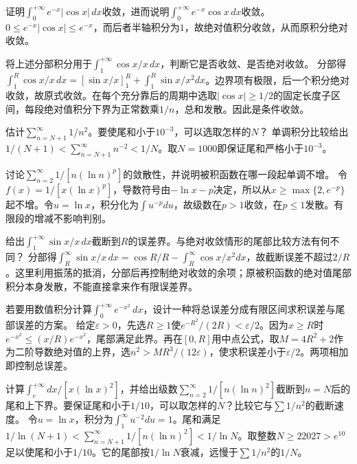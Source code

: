 证明\(\int_0^{+\infty}e^{-x}|\cos x|\,dx\)收敛，进而说明\(\int_0^{+\infty}e^{-x}\cos x\,dx\)收敛。
\solutionanswer
\(0\le e^{-x}|\cos x|\le e^{-x}\)，而后者半轴积分为\(1\)，故绝对值积分收敛，从而原积分绝对收敛。


将上述分部积分用于\(\int_1^{+\infty}\cos x/x\,dx\)，判断它是否收敛、是否绝对收敛。
\solutionanswer
分部得\(\int_1^R\cos x/x\,dx=[\sin x/x]_1^R+\int_1^R\sin x/x^2dx\)。边界项有极限，后一个积分绝对收敛，故原式收敛。在每个充分靠后的周期中选取\(|\cos x|\ge1/2\)的固定长度子区间，每段绝对值积分下界为正常数乘\(1/n\)，总和发散。因此是条件收敛。


估计\(\sum_{n=N+1}^{\infty}1/n^2\)。要使尾和小于\(10^{-3}\)，可以选取怎样的\(N\)？
\solutionanswer
单调积分比较给出\(1/(N+1)<\sum_{n=N+1}^\infty n^{-2}<1/N\)。取\(N=1000\)即保证尾和严格小于\(10^{-3}\)。


讨论\(\sum_{n=2}^{\infty}1/[n(\ln n)^p]\)的敛散性，并说明被积函数在哪一段起单调不增。
\solutionanswer
令\(f(x)=1/[x(\ln x)^p]\)，导数符号由\(-\ln x-p\)决定，所以从\(x\ge\max\{2,e^{-p}\}\)起不增。令\(u=\ln x\)，积分化为\(\int u^{-p}du\)，故级数在\(p>1\)收敛，在\(p\le1\)发散。有限段的增减不影响判别。


给出\(\int_1^{+\infty}\sin x/x\,dx\)截断到\(R\)的误差界。与绝对收敛情形的尾部比较方法有何不同？
\solutionanswer
分部得\(\int_R^\infty\sin x/x\,dx=\cos R/R-\int_R^\infty\cos x/x^2dx\)，故截断误差不超过\(2/R\)。这里利用振荡的抵消，分部后再控制绝对收敛的余项；原被积函数的绝对值尾部积分本身发散，不能直接拿来作有限误差界。


若要用数值积分计算\(\int_0^{+\infty}e^{-x^2}\,dx\)，设计一种将总误差分成有限区间求积误差与尾部误差的方案。
\solutionanswer
给定\(\varepsilon>0\)，先选\(R\ge1\)使\(e^{-R^2}/(2R)<\varepsilon/2\)。因为\(x\ge R\)时\(e^{-x^2}\le(x/R)e^{-x^2}\)，尾部满足此界。再在\([0,R]\)用中点公式，取\(M=4R^2+2\)作为二阶导数绝对值的上界，选\(n^2>MR^3/(12\varepsilon)\)，使求积误差小于\(\varepsilon/2\)。两项相加即控制总误差。


计算\(\int_e^{+\infty}dx/[x(\ln x)^2]\)，并给出级数\(\sum_{n=2}^{\infty}1/[n(\ln n)^2]\)截断到\(n=N\)后的尾和上下界。要保证尾和小于\(1/10\)，可以取怎样的\(N\)？比较它与\(\sum1/n^2\)的截断速度。
\solutionanswer
令\(u=\ln x\)，积分为\(\int_1^\infty u^{-2}du=1\)。尾和满足\(1/\ln(N+1)<\sum_{n=N+1}^\infty1/[n(\ln n)^2]<1/\ln N\)。取整数\(N\ge22027>e^{10}\)足以使尾和小于\(1/10\)。它的尾部按\(1/\ln N\)衰减，远慢于\(\sum1/n^2\)的\(1/N\)。



